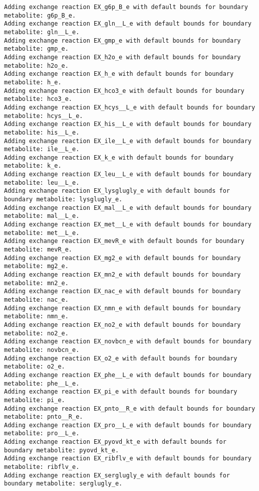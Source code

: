 \documentclass[
  letterpaper,
  DIV=11,
  numbers=noendperiod]{scrartcl}
\begin{document}
\begin{verbatim}
Adding exchange reaction EX_g6p_B_e with default bounds for boundary metabolite: g6p_B_e.
Adding exchange reaction EX_gln__L_e with default bounds for boundary metabolite: gln__L_e.
Adding exchange reaction EX_gmp_e with default bounds for boundary metabolite: gmp_e.
Adding exchange reaction EX_h2o_e with default bounds for boundary metabolite: h2o_e.
Adding exchange reaction EX_h_e with default bounds for boundary metabolite: h_e.
Adding exchange reaction EX_hco3_e with default bounds for boundary metabolite: hco3_e.
Adding exchange reaction EX_hcys__L_e with default bounds for boundary metabolite: hcys__L_e.
Adding exchange reaction EX_his__L_e with default bounds for boundary metabolite: his__L_e.
Adding exchange reaction EX_ile__L_e with default bounds for boundary metabolite: ile__L_e.
Adding exchange reaction EX_k_e with default bounds for boundary metabolite: k_e.
Adding exchange reaction EX_leu__L_e with default bounds for boundary metabolite: leu__L_e.
Adding exchange reaction EX_lysglugly_e with default bounds for boundary metabolite: lysglugly_e.
Adding exchange reaction EX_mal__L_e with default bounds for boundary metabolite: mal__L_e.
Adding exchange reaction EX_met__L_e with default bounds for boundary metabolite: met__L_e.
Adding exchange reaction EX_mevR_e with default bounds for boundary metabolite: mevR_e.
Adding exchange reaction EX_mg2_e with default bounds for boundary metabolite: mg2_e.
Adding exchange reaction EX_mn2_e with default bounds for boundary metabolite: mn2_e.
Adding exchange reaction EX_nac_e with default bounds for boundary metabolite: nac_e.
Adding exchange reaction EX_nmn_e with default bounds for boundary metabolite: nmn_e.
Adding exchange reaction EX_no2_e with default bounds for boundary metabolite: no2_e.
Adding exchange reaction EX_novbcn_e with default bounds for boundary metabolite: novbcn_e.
Adding exchange reaction EX_o2_e with default bounds for boundary metabolite: o2_e.
Adding exchange reaction EX_phe__L_e with default bounds for boundary metabolite: phe__L_e.
Adding exchange reaction EX_pi_e with default bounds for boundary metabolite: pi_e.
Adding exchange reaction EX_pnto__R_e with default bounds for boundary metabolite: pnto__R_e.
Adding exchange reaction EX_pro__L_e with default bounds for boundary metabolite: pro__L_e.
Adding exchange reaction EX_pyovd_kt_e with default bounds for boundary metabolite: pyovd_kt_e.
Adding exchange reaction EX_ribflv_e with default bounds for boundary metabolite: ribflv_e.
Adding exchange reaction EX_serglugly_e with default bounds for boundary metabolite: serglugly_e.

\end{verbatim}
\end{document}
